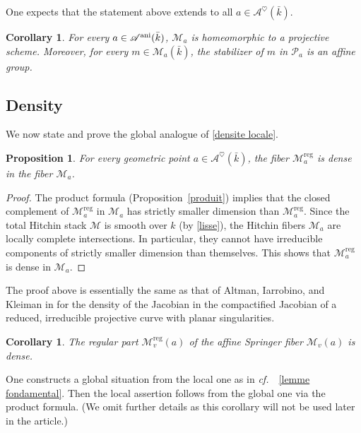 \documentclass[12pt,english]{smfart}
\numberwithin{equation}{subsection}
\newtheorem{proposition}[equation]{Proposition}
\newtheorem{corollary}[equation]{Corollary}
\theoremstyle{remark}
\newcommand\calA{{\mathscr A}}
\newcommand\calP{{\mathscr P}}
\newcommand\calM{{\mathscr M}}
\newcommand\cf{{\it cf.\ }}
\newcommand\ani{{\rm ani}}
\begin{document}
One expects that the statement above extends to all $a\in\mathcal{A}^\heartsuit(\bar{k})$.

\begin{corollary}\label{Ma projectif}
For every $a\in\calA^\ani(\bar k)$, $\calM_a$ is homeomorphic to a projective scheme. Moreover, for every $m\in\calM_a(\bar k)$, the stabilizer of $m$ in $\calP_a$ is an affine group.
\end{corollary}

\subsection{Density}\label{dense}

We now state and prove the global analogue of \ref{densite locale}.

\begin{proposition}\label{densite globale}
For every geometric point $a\in\mathcal{A}^\heartsuit(\bar{k})$, the fiber $\mathcal{M}^\mathrm{reg}_a$ is dense in the fiber $\mathcal{M}_a$.
\end{proposition}

\begin{proof}
The product formula (Proposition~\ref{produit}) implies that the closed complement of $\mathcal{M}^\mathrm{reg}_a$ in $\mathcal{M}_a$
has strictly smaller dimension than $\mathcal{M}^\mathrm{reg}_a$. Since the total Hitchin stack $\mathcal{M}$ is smooth over $k$ (by \ref{lisse}),
the Hitchin fibers $\mathcal{M}_a$ are locally complete intersections. In particular, they cannot have irreducible components of strictly smaller dimension than themselves.
This shows that $\mathcal{M}^\mathrm{reg}_a$ is dense in $\mathcal{M}_a$.
\end{proof}

The proof above is essentially the same as that of Altman, Iarrobino, and Kleiman in \cite{AIK} for the density of the Jacobian in the compactified Jacobian of a reduced,
irreducible projective curve with planar singularities.

\begin{corollary}
The regular part $\mathcal{M}_v^\mathrm{reg}(a)$ of the affine Springer fiber $\mathcal{M}_v(a)$ is dense.
\end{corollary}

One constructs a global situation from the local one as in \cf\ \ref{lemme fondamental}.
Then the local assertion follows from the global one via the product formula. (We omit further details as this corollary will not be used later in the article.)
\end{document}
